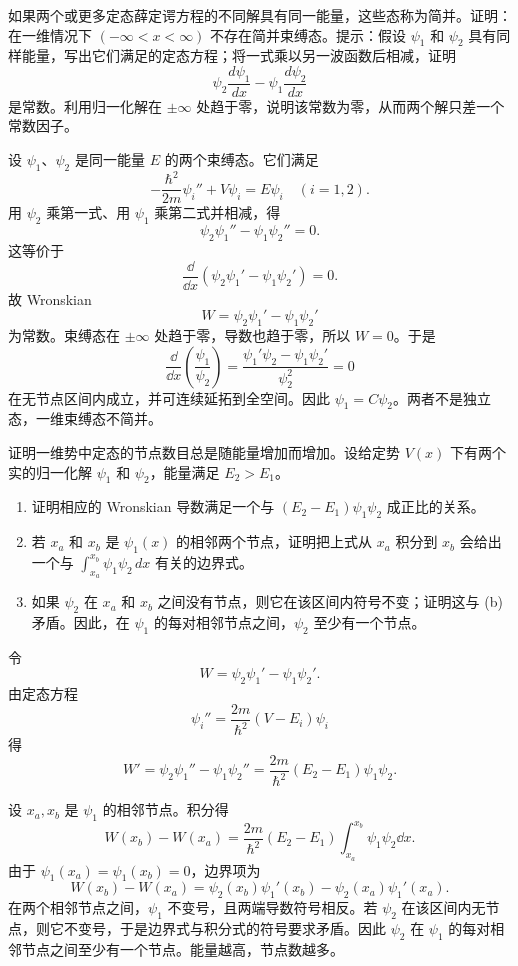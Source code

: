 \begin{question}
如果两个或更多定态薛定谔方程的不同解具有同一能量，这些态称为简并。证明：在一维情况下 $(-\infty<x<\infty)$ 不存在简并束缚态。提示：假设 $\psi_1$ 和 $\psi_2$ 具有同样能量，写出它们满足的定态方程；将一式乘以另一波函数后相减，证明
\[
\psi_2\frac{d\psi_1}{dx}-\psi_1\frac{d\psi_2}{dx}
\]
是常数。利用归一化解在 $\pm\infty$ 处趋于零，说明该常数为零，从而两个解只差一个常数因子。
\end{question}
\begin{solution}
设 $\psi_1$、$\psi_2$ 是同一能量 $E$ 的两个束缚态。它们满足
\[
-\frac{\hbar^2}{2m}\psi_i''+V\psi_i=E\psi_i\quad(i=1,2).
\]
用 $\psi_2$ 乘第一式、用 $\psi_1$ 乘第二式并相减，得
\[
\psi_2\psi_1''-\psi_1\psi_2''=0.
\]
这等价于
\[
\frac{\dd}{\dd x}\left(\psi_2\psi_1'-\psi_1\psi_2'\right)=0.
\]
故 Wronskian
\[
W=\psi_2\psi_1'-\psi_1\psi_2'
\]
为常数。束缚态在 $\pm\infty$ 处趋于零，导数也趋于零，所以 $W=0$。于是
\[
\frac{\dd}{\dd x}\left(\frac{\psi_1}{\psi_2}\right)=\frac{\psi_1'\psi_2-\psi_1\psi_2'}{\psi_2^2}=0
\]
在无节点区间内成立，并可连续延拓到全空间。因此 $\psi_1=C\psi_2$。两者不是独立态，一维束缚态不简并。
\end{solution}

\begin{question}
证明一维势中定态的节点数目总是随能量增加而增加。设给定势 $V(x)$ 下有两个实的归一化解 $\psi_1$ 和 $\psi_2$，能量满足 $E_2>E_1$。
\begin{enumerate}
\item 证明相应的 Wronskian 导数满足一个与 $(E_2-E_1)\psi_1\psi_2$ 成正比的关系。
\item 若 $x_a$ 和 $x_b$ 是 $\psi_1(x)$ 的相邻两个节点，证明把上式从 $x_a$ 积分到 $x_b$ 会给出一个与 $\int_{x_a}^{x_b}\psi_1\psi_2\,dx$ 有关的边界式。
\item 如果 $\psi_2$ 在 $x_a$ 和 $x_b$ 之间没有节点，则它在该区间内符号不变；证明这与 (b) 矛盾。因此，在 $\psi_1$ 的每对相邻节点之间，$\psi_2$ 至少有一个节点。
\end{enumerate}
\end{question}
\begin{solution}
令
\[
W=\psi_2\psi_1'-\psi_1\psi_2'.
\]
由定态方程
\[
\psi_i''=\frac{2m}{\hbar^2}(V-E_i)\psi_i
\]
得
\[
W'=\psi_2\psi_1''-\psi_1\psi_2''
=\frac{2m}{\hbar^2}(E_2-E_1)\psi_1\psi_2.
\]

设 $x_a,x_b$ 是 $\psi_1$ 的相邻节点。积分得
\[
W(x_b)-W(x_a)=\frac{2m}{\hbar^2}(E_2-E_1)
\int_{x_a}^{x_b}\psi_1\psi_2\dd x.
\]
由于 $\psi_1(x_a)=\psi_1(x_b)=0$，边界项为
\[
W(x_b)-W(x_a)=\psi_2(x_b)\psi_1'(x_b)-\psi_2(x_a)\psi_1'(x_a).
\]
在两个相邻节点之间，$\psi_1$ 不变号，且两端导数符号相反。若 $\psi_2$ 在该区间内无节点，则它不变号，于是边界式与积分式的符号要求矛盾。因此 $\psi_2$ 在 $\psi_1$ 的每对相邻节点之间至少有一个节点。能量越高，节点数越多。
\end{solution}

